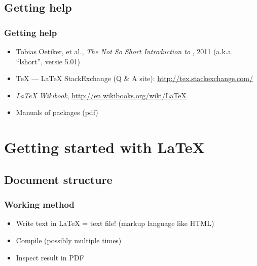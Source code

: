 \documentclass[aspectratio=169]{beamer}
\begin{document}
\subsection{Getting help}

\begin{frame}
  \frametitle{Getting help}

  \begin{itemize}
    \item Tobias Oetiker, et al., \emph{The Not So Short Introduction to {\LaTeXe}}, 2011 (a.k.a. ``lshort'', versie 5.01)
    \item {\TeX} --- {\LaTeX} StackExchange (Q \& A site): \url{http://tex.stackexchange.com/}
    \item \emph{{\LaTeX} Wikibook}, \url{http://en.wikibooks.org/wiki/LaTeX}
    \item Manuals of packages (pdf)
  \end{itemize}

\end{frame}

\section{Getting started with {\LaTeX}}

\subsection{Document structure}

\begin{frame}
  \frametitle{Working method}

  \begin{itemize}
    \item<+-> Write text in {\LaTeX}
    = text file! (markup language like HTML)
    \item<+-> Compile (possibly multiple times)
    \item<+-> Inspect result in PDF
  \end{itemize}
\end{frame}
\end{document}
